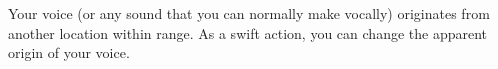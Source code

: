 \begin{spellheader}
    \spellrng{\rngmed}
    \begin{spelltargetinginfo}
    \end{spelltargetinginfo}
\end{spellheader}
\begin{spellcontent}
    \begin{spelleffects}
        \spelleffect Your voice (or any sound that you can normally make vocally) originates from another location within range. As a swift action, you can change the apparent origin of your voice.
        \spelldur{\durshort \dismissable}
    \end{spelleffects}
\end{spellcontent}
\begin{spellfooter}

\end{spellfooter}

\begin{comment}
\spellsection{Vestments of the Mage}{2}
\begin{spellheader}
    \spelldesc{You imbue a set of armor with magical power, preventing it from interfering with your spellcasting.}
    \begin{spelltargetinginfo}
        \spelltwocol{\spelltgt{One nonmagical armor or shield}}{\spellrng{Touch}}
    \end{spelltargetinginfo}
\end{spellheader}
\begin{spellcontent}
    \begin{spelleffects}
        \spelleffect The armor or shield's chance of arcane spell failure decreases by 10\% as long as you are wearing or using it. If any other creature wears the armor, it receives no benefit from this spell.
        \spelldur{\durext \dismissable}
    \end{spelleffects}
\end{spellcontent}
\begin{spellfooter}
    \spellinfo{Transmutation (Imbuement)}{Arcane}
    \spellnotes This decrease is considered an enhancement enhancement bonus.
\end{spellfooter}%
\end{comment}

